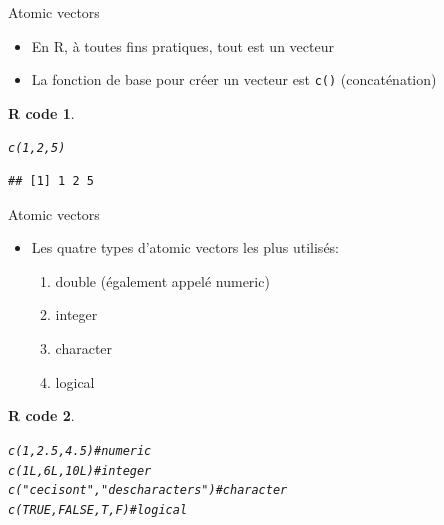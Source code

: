 \documentclass[11pt]{beamer}\usepackage[]{graphicx}\usepackage[]{color}
\makeatletter
\newcommand{\hlnum}[1]{\textcolor[rgb]{0.063,0.58,0.627}{#1}}%
\newcommand{\hlstr}[1]{\textcolor[rgb]{0.063,0.58,0.627}{#1}}%
\newcommand{\hlcom}[1]{\textcolor[rgb]{0.588,0.588,0.588}{#1}}%
\newcommand{\hlstd}[1]{\textcolor[rgb]{0.196,0.196,0.196}{#1}}%
\newcommand{\hlkwd}[1]{\textcolor[rgb]{0.78,0.227,0.412}{#1}}%
\newenvironment{kframe}{%
 \def\at@end@of@kframe{}%
 \ifinner\ifhmode%
  \def\at@end@of@kframe{\end{minipage}}%
  \begin{minipage}{\columnwidth}%
 \fi\fi%
 \def\FrameCommand##1{\hskip\@totalleftmargin \hskip-\fboxsep
 \colorbox{shadecolor}{##1}\hskip-\fboxsep
     \hskip-\linewidth \hskip-\@totalleftmargin \hskip\columnwidth}%
 \MakeFramed {\advance\hsize-\width
   \@totalleftmargin\z@ \linewidth\hsize
   \@setminipage}}%
 {\par\unskip\endMakeFramed%
 \at@end@of@kframe}
\newenvironment{knitrout}{}{} %
\newtheorem{rcode}{R code}[section]
\newcommand{\code}[1]{\texttt{#1}}
\makeatother
\begin{document}
\begin{frame}[fragile]{Atomic vectors}

\begin{itemize}
  \setlength\itemsep{2em}
\item En R, à toutes fins pratiques, tout est un vecteur
\pause \item La fonction de base pour créer un vecteur est \code{c()} (concaténation)
\end{itemize}
\pause
\begin{knitrout}
\color{fgcolor}\begin{kframe}
\begin{rcode}\label{unnamed-chunk-12}\begin{alltt}
\hlkwd{c}\hlstd{(}\hlnum{1}\hlstd{,} \hlnum{2}\hlstd{,} \hlnum{5}\hlstd{)}
\end{alltt}
\begin{verbatim}
## [1] 1 2 5
\end{verbatim}
\end{rcode}\end{kframe}
\end{knitrout}

\end{frame}




\begin{frame}[fragile]{Atomic vectors}

\begin{itemize}
  \setlength\itemsep{2em}
\item Les quatre types d'atomic vectors les plus utilisés: 
\begin{enumerate}
\item double (également appelé numeric)
\item integer
\item character
\item logical
\end{enumerate}
\end{itemize}
\pause
\begin{knitrout}
\color{fgcolor}\begin{kframe}
\begin{rcode}\label{unnamed-chunk-13}\begin{alltt}
\hlkwd{c}\hlstd{(}\hlnum{1}\hlstd{,} \hlnum{2.5}\hlstd{,} \hlnum{4.5}\hlstd{)} \hlcom{# numeric}
\hlkwd{c}\hlstd{(}\hlnum{1L}\hlstd{,} \hlnum{6L}\hlstd{,} \hlnum{10L}\hlstd{)} \hlcom{# integer}
\hlkwd{c}\hlstd{(}\hlstr{"ceci sont"}\hlstd{,} \hlstr{"des characters"}\hlstd{)} \hlcom{#character}
\hlkwd{c}\hlstd{(}\hlnum{TRUE}\hlstd{,} \hlnum{FALSE}\hlstd{, T, F)} \hlcom{# logical}
\end{alltt}
\end{rcode}\end{kframe}
\end{knitrout}

\end{frame}
\end{document}

